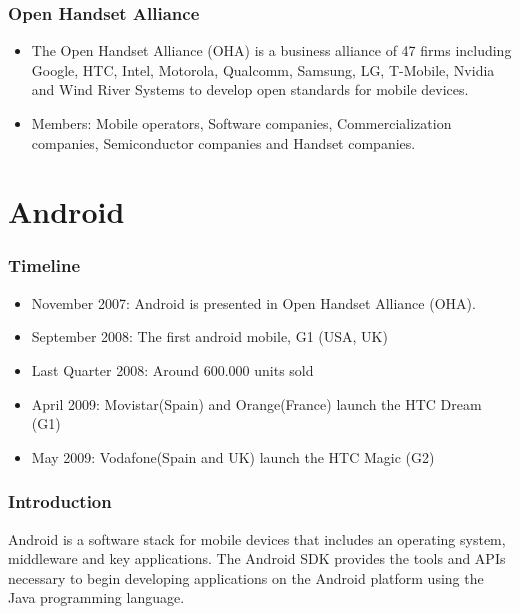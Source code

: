 \documentclass{beamer}
\begin{document}
\begin{frame}
\frametitle{Open Handset Alliance}
\begin{itemize}
\item The Open Handset Alliance (OHA) is a business alliance of 47
  firms including Google, HTC, Intel, Motorola, Qualcomm, Samsung, LG,
  T-Mobile, Nvidia and Wind River Systems to develop open standards
  for mobile devices.
\item Members: Mobile operators, Software companies, Commercialization
  companies, Semiconductor companies and Handset companies.

\begin{center}
\end{center}
\end{itemize}
\end{frame}


\section{Android}

\begin{frame}
\frametitle{Timeline}
\begin{itemize}
\item November 2007: Android is presented in Open Handset Alliance
  (OHA).
\item September 2008: The first android mobile, G1 (USA, UK)
\item Last Quarter 2008: Around 600.000 units sold
\item April 2009: Movistar(Spain) and Orange(France) launch the
  HTC Dream (G1) 
\item May 2009: Vodafone(Spain and UK) launch the HTC Magic (G2)
\end{itemize}
\begin{center}
\end{center}
\end{frame}


\begin{frame}
\frametitle{Introduction}

Android is a software stack for mobile devices that includes an
operating system, middleware and key applications. The Android SDK
provides the tools and APIs necessary to begin developing applications
on the Android platform using the Java programming language.

\end{frame}
\end{document}
